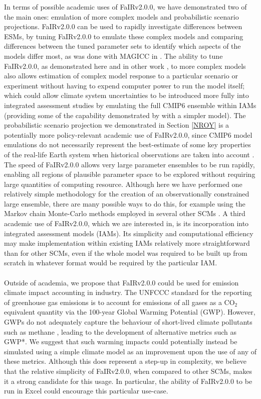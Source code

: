 \documentclass[gmd, manuscript]{copernicus}
\begin{document}
In terms of possible academic uses of FaIRv2.0.0, we have demonstrated two of the main ones: emulation of more complex models and probabilistic scenario projections. FaIRv2.0.0 can be used to rapidly investigate differences between ESMs, by tuning FaIRv2.0.0 to emulate these complex models and comparing differences between the tuned parameter sets to identify which aspects of the models differ most, as was done with MAGICC in \cite{Meinshausen2011,Meinshausen2011b}. The ability to tune FaIRv2.0.0, as demonstrated here and in other work \citep{Tsutsui2017,Joos2013,Millar2016}, to more complex models also allows estimation of complex model response to a particular scenario or experiment without having to expend computer power to run the model itself; which could allow climate system uncertainties to be introduced more fully into integrated assessment studies by emulating the full CMIP6 ensemble within IAMs (providing some of the capability demonstrated by \cite{Meinshausen2011} with a simpler model). The probabilistic scenario projection we demonstrated in Section \ref{NROY} is a potentially more policy-relevant academic use of FaIRv2.0.0, since CMIP6 model emulations do not necessarily represent the best-estimate of some key properties of the real-life Earth system when historical observations are taken into account \citep{Tokarska2020a, Gillett2021}. The speed of FaIRv2.0.0 allows very large parameter ensembles to be run rapidly, enabling all regions of plausible parameter space to be explored without requiring large quantities of computing resource. Although here we have performed one relatively simple methodology for the creation of an observationally constrained large ensemble, there are many possible ways to do this, for example using the Markov chain Monte-Carlo methods employed in several other SCMs \citep{Nicholls2020,Meinshausen2019,Meinshausen2011b}. A third academic use of FaIRv2.0.0, which we are interested in, is its incorporation into integrated assessment models (IAMs). Its simplicity and computational efficiency may make implementation within existing IAMs relatively more straightforward than for other SCMs, even if the whole model was required to be built up from scratch in whatever format would be required by the particular IAM.\\\\
Outside of academia, we propose that FaIRv2.0.0 could be used for emission climate impact accounting in industry. The UNFCCC standard for the reporting of greenhouse gas emissions is to account for emissions of all gases as a CO$_2$ equivalent quantity via the 100-year Global Warming Potential (GWP). However, GWPs do not adequately capture the behaviour of short-lived climate pollutants such as methane \citep{Cain2019}, leading to the development of alternative metrics such as GWP*. We suggest that such warming impacts could potentially instead be simulated using a simple climate model as an improvement upon the use of any of these metrics. Although this does represent a step-up in complexity, we believe that the relative simplicity of FaIRv2.0.0, when compared to other SCMs, makes it a strong candidate for this usage. In particular, the ability of FaIRv2.0.0 to be run in Excel could encourage this particular use-case.
\end{document}
